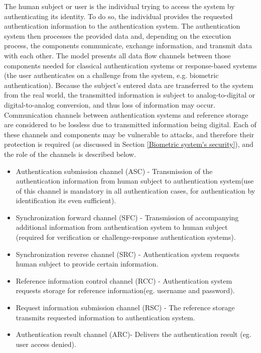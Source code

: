 The human subject or user is the individual trying to access the system by authenticating its identity. To do so, the individual provides the requested authentication information to the authentication system. The authentication system then processes the provided data and, depending on the execution process, the components communicate, exchange information, and transmit data with each other. The model presents all data flow channels between those components needed for classical authentication systems or response-based systems (the user authenticates on a challenge from the system, e.g. biometric authentication). Because the subject's entered data are transferred to the system from the real world, the transmitted information is subject to analog-to-digital or digital-to-analog conversion, and thus loss of information may occur. Communication channels between authentication systems and reference storage are considered to be lossless due to transmitted information being digital. Each of these channels and components may be vulnerable to attacks, and therefore their protection is required (as discussed in Section \ref{Biometric system's security}), and the role of the channels is described below.

\begin{itemize}
  \item{Authentication submission channel (ASC) - Transmission of the authentication information from human subject to authentication system(use of this channel is mandatory in all authentication cases, for authentication by identification its even sufficient).}
  \item{Synchronization forward channel (SFC) - Transmission of accompanying additional information from authentication system to human subject (required for verification or challenge-response authentication systems).}
  \item{Synchronization reverse channel (SRC) - Authentication system requests human subject to provide certain information.}
  \item{Reference information control channel (RCC) - Authentication system requests storage for reference information(eg. username and password).}
  \item{Request information submission channel (RSC) - The reference storage transmits requested information to authentication system.}
  \item{Authentication result channel (ARC)- Delivers the authentication result (eg. user access denied).}
\end{itemize}

